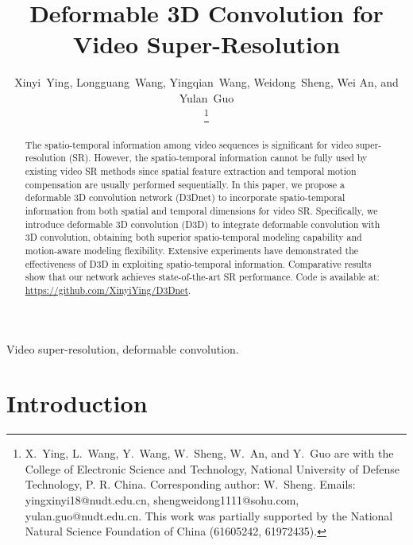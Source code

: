 \documentclass[journal]{IEEEtran}
\begin{document}
\title{Deformable 3D Convolution for Video Super-Resolution}

\author{Xinyi~Ying, Longguang~Wang, Yingqian~Wang, Weidong~Sheng, Wei An, and Yulan~Guo

\thanks{X.~Ying, L.~Wang, Y.~Wang, W.~Sheng, W.~An, and Y.~Guo are with the College of Electronic Science and Technology, National University of Defense Technology, P. R. China. Corresponding author: W.~Sheng. Emails: yingxinyi18@nudt.edu.cn, shengweidong1111@sohu.com, yulan.guo@nudt.edu.cn.
This work was partially supported by the National Natural Science Foundation of China (61605242, 61972435).}}


\maketitle

\begin{abstract}
 The spatio-temporal information among video sequences is significant for video super-resolution (SR). However, the spatio-temporal information cannot be fully used by existing video SR methods since spatial feature extraction and temporal motion compensation are usually performed sequentially. In this paper, we propose a deformable 3D convolution network (D3Dnet) to incorporate spatio-temporal information from both spatial and temporal dimensions for video SR. Specifically, we introduce deformable 3D convolution (D3D) to integrate deformable convolution with 3D convolution, obtaining both superior spatio-temporal modeling capability and motion-aware modeling flexibility. Extensive experiments have demonstrated the effectiveness of D3D in exploiting spatio-temporal information. Comparative results show that our network achieves state-of-the-art SR performance. Code is available at: \url{https://github.com/XinyiYing/D3Dnet}.
\end{abstract}

\begin{IEEEkeywords}
Video super-resolution, deformable convolution.
\end{IEEEkeywords}

\section{Introduction}\label{sec1}
\end{document}
